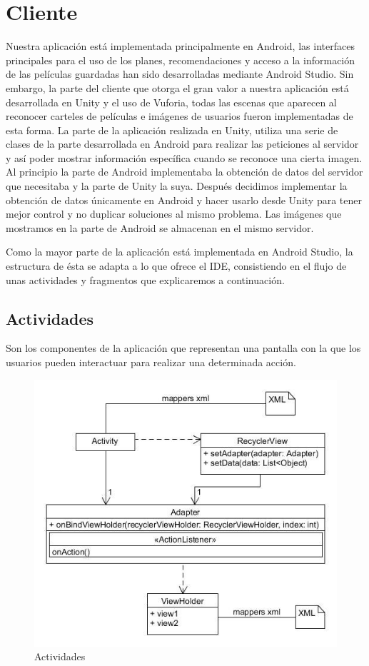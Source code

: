 \section{Cliente}
\label{makereference4.4}
Nuestra aplicación está implementada principalmente en Android, las interfaces principales para el uso de los planes, recomendaciones y acceso a la información de las películas guardadas han sido desarrolladas mediante Android Studio. Sin embargo,
la parte del cliente que otorga el gran valor a nuestra aplicación está desarrollada en Unity y el uso de Vuforia, todas las escenas que aparecen al reconocer carteles de películas e imágenes de usuarios fueron implementadas de esta forma.
La parte de la aplicación realizada en Unity, utiliza una serie de clases de la parte desarrollada en Android para realizar las peticiones al servidor y así poder mostrar información específica cuando se reconoce una cierta imagen.
Al principio la parte de Android implementaba la obtención de datos del servidor que necesitaba y la parte de Unity la suya. Después decidimos implementar la obtención de datos únicamente en Android y hacer usarlo desde Unity para tener mejor control y no duplicar soluciones al mismo problema.
Las imágenes que mostramos en la parte de Android se almacenan en el mismo servidor.


Como la mayor parte de la aplicación está implementada en Android Studio, la estructura de ésta se adapta a lo que ofrece el IDE, consistiendo en el flujo de unas actividades y fragmentos que explicaremos a continuación.


\subsection{Actividades}
\label{makereference4.4.1}
Son los componentes de la aplicación que representan una pantalla con la que los usuarios pueden interactuar para realizar una determinada acción.
\begin{figure}[H]
    \centering
    \includegraphics[width=6in]{figures/chapter-4/Activity.jpeg}
    \caption{Actividades}
    \label{fig:activity}
\end{figure}

